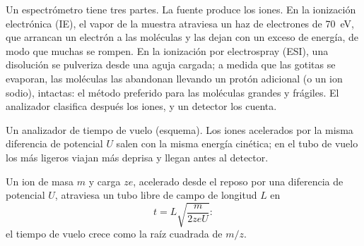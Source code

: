Un espectrómetro tiene tres partes. La fuente produce los iones. En la ionización electrónica (IE), el vapor de la
muestra atraviesa un haz de electrones de \qty{70}{eV}, que arrancan un electrón a las moléculas y
las dejan con un exceso de energía, de modo que muchas se rompen. En la ionización por electrospray (ESI), una disolución se
pulveriza desde una aguja cargada; a medida que las gotitas se evaporan, las moléculas las abandonan llevando un protón adicional
(o un ion sodio), intactas: el método preferido para las moléculas grandes y frágiles. El analizador clasifica después
los iones, y un detector los cuenta.

\begin{omfigure}
\par\vspace{4pt}

{\small Un analizador de tiempo de vuelo (esquema). Los iones acelerados por la misma diferencia de potencial
$U$ salen con la misma energía cinética; en el tubo de vuelo los más ligeros viajan más deprisa y llegan antes al
detector.}
\end{omfigure}

\begin{proposition}\label{prop:b2:mass-spec-atomic:time-of-flight}
Un ion de masa $m$ y carga $ze$, acelerado desde el reposo por una diferencia de potencial $U$, atraviesa un
tubo libre de campo de longitud $L$ en
\begin{equation*}
t = L\sqrt{\frac{m}{2zeU}}:
\end{equation*}
el tiempo de vuelo crece como la raíz cuadrada de $m/z$.
\end{proposition}


